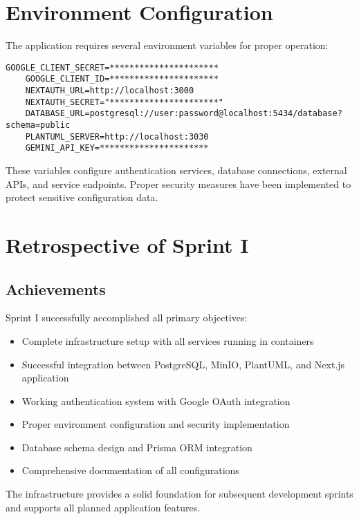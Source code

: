\section{Environment Configuration}

The application requires several environment variables for proper operation:

\begin{lstlisting}[caption=Environment Variables Configuration]
    GOOGLE_CLIENT_SECRET=**********************
    GOOGLE_CLIENT_ID=**********************
    NEXTAUTH_URL=http://localhost:3000
    NEXTAUTH_SECRET="**********************"
    DATABASE_URL=postgresql://user:password@localhost:5434/database?schema=public
    PLANTUML_SERVER=http://localhost:3030
    GEMINI_API_KEY=**********************
\end{lstlisting}

These variables configure authentication services, database connections, external APIs, and service endpoints. Proper security measures have been implemented to protect sensitive configuration data.

\section{Retrospective of Sprint I}

\subsection{Achievements}

Sprint I successfully accomplished all primary objectives:

\begin{itemize}
    \item Complete infrastructure setup with all services running in containers
    \item Successful integration between PostgreSQL, MinIO, PlantUML, and Next.js application
    \item Working authentication system with Google OAuth integration
    \item Proper environment configuration and security implementation
    \item Database schema design and Prisma ORM integration
    \item Comprehensive documentation of all configurations
\end{itemize}

The infrastructure provides a solid foundation for subsequent development sprints and supports all planned application features.

